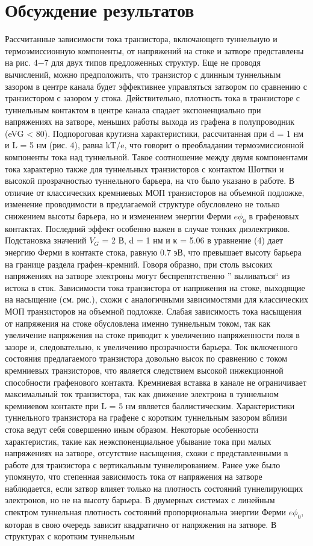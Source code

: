 \documentclass[a4paper,12pt]{article} %
\begin{document}
\section{Обсуждение результатов}
\noindent Рассчитанные зависимости тока транзистора, включающего туннельную и термоэмиссионную компоненты, от напряжений на стоке и затворе представлены на рис. 4−7 для двух типов предложенных структур. Еще не проводя вычислений, можно предположить, что транзистор с длинным туннельным зазором в центре канала будет эффективнее управляться затвором по сравнению с транзистором с зазором у стока. Действительно, плотность тока в транзисторе с туннельным контактом в центре канала спадает экспоненциально при напряжениях на затворе, меньших работы выхода из графена в полупроводник (eVG < 80). Подпороговая крутизна характеристики, рассчитанная при d = 1 нм и L = 5 нм (рис. 4), равна kT/e, что говорит о преобладании термоэмиссионной компоненты тока над туннельной. Такое соотношение между двумя компонентами тока характерно также для туннельных транзисторов с контактом Шоттки и высокой прозрачностью туннельного барьера, на что было указано в работе. В отличие от классических кремниевых МОП транзисторов на объемной подложке, изменение проводимости в предлагаемой структуре обусловлено не только снижением высоты барьера, но и изменением энергии Ферми $e\phi_0$ в графеновых контактах. Последний эффект особенно важен в случае тонких диэлектриков. Подстановка значений $V_G$ = 2 В, d = 1 нм и κ = 5.06 в уравнение (4) дает энергию Ферми в контакте стока, равную 0.7 эВ, что превышает высоту барьера на границе раздела графен–кремний. Говоря образно, при столь высоких напряжениях на затворе электроны могут беспрепятственно ” выливаться“ из истока в сток. Зависимости тока транзистора от напряжения на стоке, выходящие на насыщение (см. рис.), схожи с аналогичными зависимостями для классических МОП транзисторов на объемной подложке. Слабая зависимость тока насыщения от напряжения на стоке обусловлена именно туннельным током, так как увеличение напряжения на стоке приводит к увеличению напряженности поля в зазоре и, следовательно, к увеличению прозрачности барьера. Ток включенного состояния предлагаемого транзистора довольно высок по сравнению с током кремниевых транзисторов, что является следствием высокой инжекционной способности графенового контакта. Кремниевая вставка в канале не ограничивает максимальный ток транзистора, так как движение электрона в туннельном кремниевом контакте при L = 5 нм является баллистическим. Характеристики туннельного транзистора на графене с коротким туннельным зазором вблизи стока ведут себя совершенно иным образом. Некоторые особенности характеристик, такие как неэкспоненциальное убывание тока при малых напряжениях на затворе, отсутствие насыщения, схожи с представленными в работе для транзистора с вертикальным туннелированием. Ранее уже было упомянуто, что степенная зависимость тока от напряжения на затворе наблюдается, если затвор влияет только на плотность состояний туннелирующих электронов, но не на высоту барьера. В двумерных системах с линейным спектром туннельная плотность состояний пропорциональна энергии Ферми $e\phi_0$, которая в свою очередь зависит квадратично от напряжения на затворе. В структурах с коротким туннельным 
\end{document}

